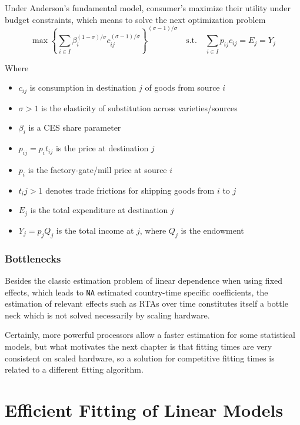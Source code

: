 \documentclass[12pt,reqno,oneside,pdftex]{formato-puc/puctesis} %
\providecommand{\tightlist}{%
  \setlength{\itemsep}{0pt}\setlength{\parskip}{0pt}}
\begin{document}
Under Anderson's fundamental model, consumer's maximize their utility
under budget constraints, which means to solve the next optimization
problem \begin{equation*}
\max \left\{ \sum_{i\in I} \beta_i^{(1 - \sigma) / \sigma} c_{ij}^{(\sigma - 1) / \sigma} \right\}^{(\sigma - 1) / \sigma} \quad \text{s.t.} \quad \sum_{i \in I} p_{ij} c_{ij} = E_j = Y_j
\end{equation*}

Where

\begin{itemize}
\tightlist
\item
  \(c_{ij}\) is consumption in destination \(j\) of goods from source
  \(i\)
\item
  \(\sigma > 1\) is the elasticity of substitution across
  varieties/sources
\item
  \(\beta_i\) is a CES share parameter
\item
  \(p_{ij} = p_i t_{ij}\) is the price at destination \(j\)
\item
  \(p_i\) is the factory-gate/mill price at source \(i\)
\item
  \(t_ij > 1\) denotes trade frictions for shipping goods from \(i\) to
  \(j\)
\item
  \(E_j\) is the total expenditure at destination \(j\)
\item
  \(Y_j = p_j Q_j\) is the total income at \(j\), where \(Q_j\) is the
  endowment
\end{itemize}

\hypertarget{bottlenecks}{%
\subsection{Bottlenecks}\label{bottlenecks}}

Besides the classic estimation problem of linear dependence when using
fixed effects, which leads to \texttt{NA} estimated country-time
specific coefficients, the estimation of relevant effects such as RTAs
over time constitutes itself a bottle neck which is not solved
necessarily by scaling hardware.

Certainly, more powerful processors allow a faster estimation for some
statistical models, but what motivates the next chapter is that fitting
times are very consistent on scaled hardware, so a solution for
competitive fitting times is related to a different fitting algorithm.

\chapter{Efficient Fitting of Linear Models}
\end{document}
